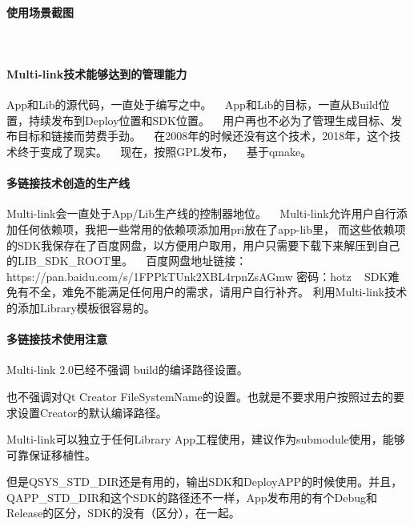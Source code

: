 \paragraph*{使用场景截图}

 ~\newline
 \paragraph*{Multi-\/link技术能够达到的管理能力}

App和\+Lib的源代码，一直处于编写之中。 ~\newline
App和\+Lib的目标，一直从\+Build位置，持续发布到\+Deploy位置和\+S\+D\+K位置。 ~\newline
用户再也不必为了管理生成目标、发布目标和链接而劳费手劲。 ~\newline
在2008年的时候还没有这个技术，2018年，这个技术终于变成了现实。 ~\newline
现在，按照\+G\+P\+L发布， ~\newline
基于qmake。 ~\newline
 ~\newline
 \paragraph*{多链接技术创造的生产线}

Multi-\/link会一直处于\+App/\+Lib生产线的控制器地位。 ~\newline
Multi-\/link允许用户自行添加任何依赖项，我把一些常用的依赖项添加用pri放在了app-\/lib里， 而这些依赖项的\+S\+D\+K我保存在了百度网盘，以方便用户取用，用户只需要下载下来解压到自己的\+L\+I\+B\+\_\+\+S\+D\+K\+\_\+\+R\+O\+O\+T里。 ~\newline
百度网盘地址链接：https\+://pan.baidu.\+com/s/1\+F\+P\+Pk\+T\+Unk2\+X\+B\+L4rpn\+Zs\+A\+Gmw 密码：hotz ~\newline
S\+D\+K难免有不全，难免不能满足任何用户的需求，请用户自行补齐。 利用\+Multi-\/link技术的添加\+Library模板很容易的。  ~\newline
 \paragraph*{多链接技术使用注意}


\begin{DoxyEnumerate}
\item Multi-\/link 2.\+0已经不强调 build的编译路径设置。
\item 也不强调对\+Qt Creator File\+System\+Name的设置。也就是不要求用户按照过去的要求设置\+Creator的默认编译路径。
\item Multi-\/link可以独立于任何\+Library App工程使用，建议作为submodule使用，能够可靠保证移植性。
\item 但是\+Q\+S\+Y\+S\+\_\+\+S\+T\+D\+\_\+\+D\+I\+R还是有用的，输出\+S\+D\+K和\+Deploy\+A\+P\+P的时候使用。并且，\+Q\+A\+P\+P\+\_\+\+S\+T\+D\+\_\+\+D\+I\+R和这个\+S\+D\+K的路径还不一样，\+App发布用的有个\+Debug和\+Release的区分，\+S\+D\+K的没有（区分），在一起。
\end{DoxyEnumerate}


